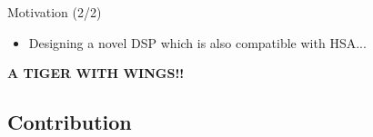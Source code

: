 \documentclass[handout]{beamer}
\begin{document}
\begin{CJK}{UTF8}{bkai}
\begin{frame}{Motivation (2/2)}
                \begin{itemize}
                    \pause
                    \item {
                            Designing a novel DSP which is also compatible with HSA...
                        }
                \end{itemize}
                \pause
                \begin{center}
                {\large{\textbf{A TIGER WITH WINGS!!}}}
                \end{center}
    \end{frame}


    \subsection{Contribution}


\end{CJK}
\end{document}
